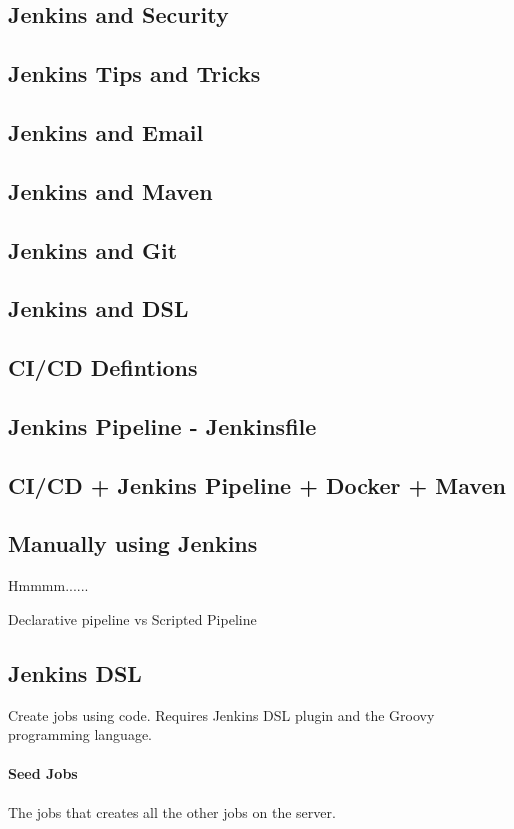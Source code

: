 \documentclass[a4paper, 11pt]{book}
\begin{document}
    \subsection{Jenkins and Security}
    \subsection{Jenkins Tips and Tricks}
    \subsection{Jenkins and Email}
    \subsection{Jenkins and Maven}
    \subsection{Jenkins and Git}
    \subsection{Jenkins and DSL}
    \subsection{CI/CD Defintions}
    \subsection{Jenkins Pipeline - Jenkinsfile}
    \subsection{CI/CD + Jenkins Pipeline + Docker + Maven}

    \subsection{Manually using Jenkins}
    Hmmmm......

    Declarative pipeline vs Scripted Pipeline

    \subsection{Jenkins DSL}
    Create jobs using code.
    Requires Jenkins DSL plugin and the Groovy programming language.

    \paragraph{Seed Jobs}
    The jobs that creates all the other jobs on the server.
\end{document}
